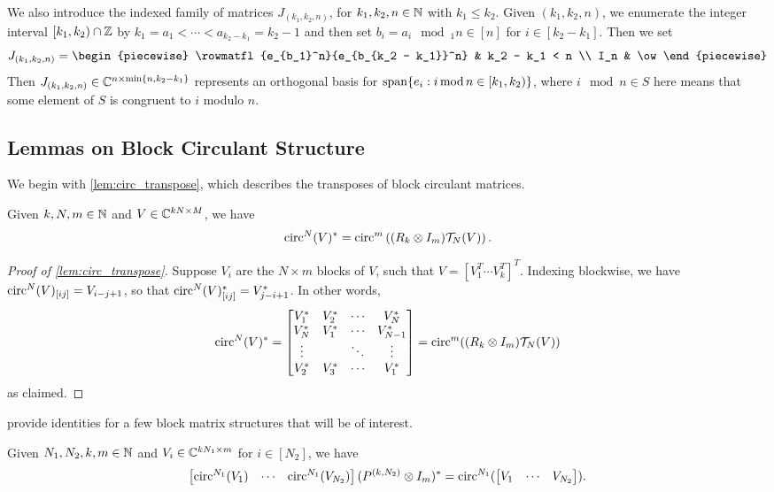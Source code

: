 We also introduce the indexed family of matrices $J_{(k_1, k_2, n)}$, for $k_1, k_2, n \in \mathbb{N}$ with $k_1 \le k_2$.  Given $(k_1, k_2, n)$, we enumerate the integer interval $[k_1, k_2) \cap \mathbb{Z}$ by $k_1 = a_1 < \cdots < a_{k_2 - k_1} = k_2 - 1$ and then set $b_i = a_i \mod_1 n \in [n]$ for $i \in [k_2 - k_1]$.  Then we set \begin{equation} J_{(k_1, k_2, n)} = \begin{piecewise} \rowmatfl{e_{b_1}^n}{e_{b_{k_2 - k_1}}^n} & k_2 - k_1 < n \\ I_n & \ow \end{piecewise} \label{eq:circ_mod_mat} \end{equation}  Then $J_{(k_1, k_2, n)} \in \mathbb{C}^{n \times \min\{n, k_2 - k_1\}}$ represents an orthogonal basis for $\operatorname{span}\{e_i : i \operatorname{\mathbin{mod}} n \in [k_1, k_2)\}$, where $i \mod n \in S$ here means that some element of $S$ is congruent to $i$ modulo $n$.

\subsection{Lemmas on Block Circulant Structure}
\label{sec:ptych_lem}
We begin with \cref{lem:circ_transpose}, which describes the transposes of block circulant matrices.
\begin{lemma}
\label{lem:circ_transpose} Given $k, N, m \in \mathbb{N}$ and $V \in \mathbb{C}^{kN \times M}$, we have \[\operatorname{circ}^N(V)^* = \operatorname{circ}^m\left( (R_k \otimes I_m) \mathcal{T}_N(V) \right).\] 
\end{lemma}
\begin{proof}[Proof of \cref{lem:circ_transpose}]
  Suppose $V_i$ are the $N \times m$ blocks of $V$, such that $V = \left[V_1^T \cdots V_k^T\right]^T$.  Indexing blockwise, we have $\operatorname{circ}^N(V)_{[ij]} = V_{i - j + 1}$, so that $\operatorname{circ}^N(V)^*_{[ij]} = V_{j - i + 1}^*$.  In other words,
  \[
  \operatorname{circ}^N(V)^* = \begin{bmatrix} V_1^* & V_2^* & \cdots & V_N^* \\ V_N^* & V_1^* & \cdots & V_{N - 1}^* \\ \vdots & & \ddots & \vdots \\ V_2^* & V_3^* & \cdots & V_1^* \end{bmatrix} = \operatorname{circ}^m((R_k \otimes I_m) \mathcal{T}_N(V) )
  \]
  as claimed.  
\end{proof}

 provide identities for a few block matrix structures that will be of interest.
\begin{lemma}\label{lem:block_circ_right}
  Given $N_1, N_2, k, m \in \mathbb{N}$ and $V_i \in \mathbb{C}^{k N_1 \times m}$ for $i \in [N_2]$, we have \[\begin{bmatrix} \operatorname{circ}^{N_1}(V_1) & \cdots & \operatorname{circ}^{N_1}(V_{N_2}) \end{bmatrix} (P^{(k, N_2)} \otimes I_m)^* = \operatorname{circ}^{N_1}(\begin{bmatrix} V_1 & \cdots & V_{N_2}\end{bmatrix}).\]
\end{lemma}

